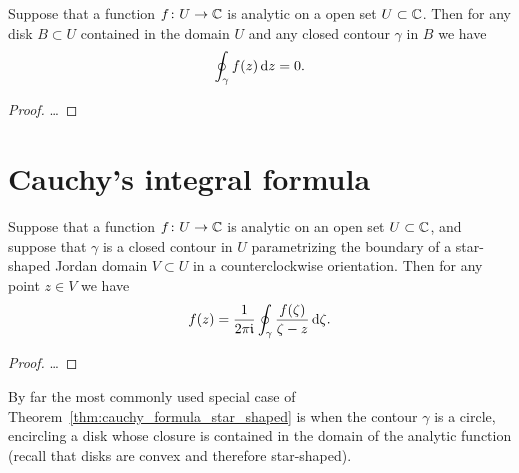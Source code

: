 \begin{corollary}
  \label{cor:local_cauchy_theorem}
  Suppose that a function $f \colon U \to \mathbb{C}$ is analytic on a open
  set $U \subset \mathbb{C}$.
  Then for any disk $B \subset U$ contained in the domain $U$
  and any closed contour $\gamma$ in $B$ we have
  \begin{align*}
    \oint_\gamma f(z) \, \mathrm{d} z = 0 .
  \end{align*}
\end{corollary}
\begin{proof}
  \ldots
\end{proof}



\section{Cauchy's integral formula}

\begin{theorem}
  \label{thm:cauchy_formula_star_shaped}
  Suppose that a function $f \colon U \to \mathbb{C}$ is analytic on an open
  set $U \subset \mathbb{C}$, and suppose that $\gamma$ is a closed contour
  in $U$ parametrizing the boundary of a star-shaped Jordan domain
  $V \subset U$ in a counterclockwise orientation.
  Then for any point $z \in V$ we have
  \begin{align*}
    f(z) = \frac{1}{2\pi \mathfrak{i}} \oint_\gamma \frac{f(\zeta)}{\zeta - z} \, \mathrm{d} \zeta .
  \end{align*}
\end{theorem}
\begin{proof}
  \ldots
\end{proof}

By far the most commonly used special case of
Theorem~\ref{thm:cauchy_formula_star_shaped}
is when the contour $\gamma$ is a circle, encircling a disk
whose closure is contained in the domain of the analytic function
(recall that disks are convex and therefore star-shaped).

